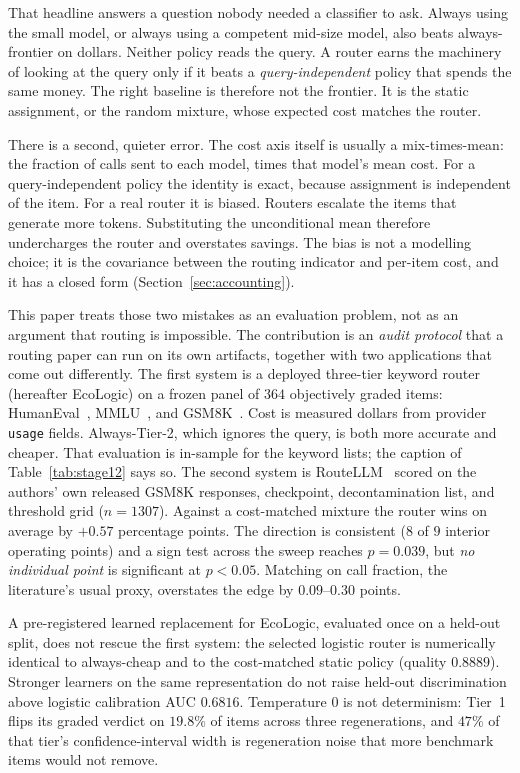 \documentclass[a4paper,twoside]{article}
\begin{document}
That headline answers a question nobody needed a classifier to ask. Always using the small model, or always using a competent mid-size model, also beats always-frontier on dollars. Neither policy reads the query. A router earns the machinery of looking at the query only if it beats a \emph{query-independent} policy that spends the same money. The right baseline is therefore not the frontier. It is the static assignment, or the random mixture, whose expected cost matches the router.

There is a second, quieter error. The cost axis itself is usually a mix-times-mean: the fraction of calls sent to each model, times that model's mean cost. For a query-independent policy the identity is exact, because assignment is independent of the item. For a real router it is biased. Routers escalate the items that generate more tokens. Substituting the unconditional mean therefore undercharges the router and overstates savings. The bias is not a modelling choice; it is the covariance between the routing indicator and per-item cost, and it has a closed form (Section~\ref{sec:accounting}).

This paper treats those two mistakes as an evaluation problem, not as an argument that routing is impossible. The contribution is an \emph{audit protocol} that a routing paper can run on its own artifacts, together with two applications that come out differently. The first system is a deployed three-tier keyword router (hereafter EcoLogic) on a frozen panel of $364$ objectively graded items: HumanEval~\cite{chen2021humaneval}, MMLU~\cite{hendrycks2021mmlu}, and GSM8K~\cite{cobbe2021gsm8k}. Cost is measured dollars from provider \texttt{usage} fields. Always-Tier-2, which ignores the query, is both more accurate and cheaper. That evaluation is in-sample for the keyword lists; the caption of Table~\ref{tab:stage12} says so. The second system is RouteLLM~\cite{ong2025routellm} scored on the authors' own released GSM8K responses, checkpoint, decontamination list, and threshold grid ($n=1307$). Against a cost-matched mixture the router wins on average by $+0.57$ percentage points. The direction is consistent ($8$ of $9$ interior operating points) and a sign test across the sweep reaches $p=0.039$, but \emph{no individual point} is significant at $p<0.05$. Matching on call fraction, the literature's usual proxy, overstates the edge by $0.09$--$0.30$ points.

A pre-registered learned replacement for EcoLogic, evaluated once on a held-out split, does not rescue the first system: the selected logistic router is numerically identical to always-cheap and to the cost-matched static policy (quality $0.8889$). Stronger learners on the same representation do not raise held-out discrimination above logistic calibration AUC $0.6816$. Temperature $0$ is not determinism: Tier~1 flips its graded verdict on $19.8\%$ of items across three regenerations, and $47\%$ of that tier's confidence-interval width is regeneration noise that more benchmark items would not remove.
\end{document}
